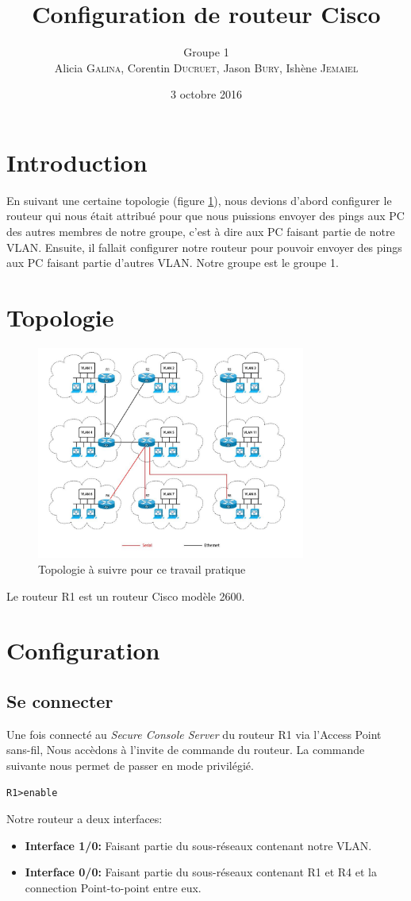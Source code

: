 \documentclass[a4paper,10pt]{article}
\title{Configuration de routeur Cisco}
\author{Groupe 1\\Alicia \textsc{Galina}, Corentin \textsc{Ducruet}, Jason \textsc{Bury}, Ishène \textsc{Jemaiel}}
\date{3 octobre 2016}
\begin{document}
\maketitle

\section{Introduction}
En suivant une certaine topologie (figure \ref{fig:topo}),
nous devions d'abord configurer le routeur qui nous était attribué pour que nous puissions envoyer des pings aux PC des autres membres de notre groupe,
c'est à dire aux PC faisant partie de notre VLAN.
Ensuite, il fallait configurer notre routeur pour pouvoir envoyer des pings aux PC faisant partie d'autres VLAN.
Notre groupe est le groupe 1.

\section{Topologie}
\begin{figure}
 \centering
 \includegraphics[height=7cm]{topo.jpg}
 \caption{Topologie à suivre pour ce travail pratique}
 \label{fig:topo}
\end{figure}
Le routeur R1 est un routeur Cisco modèle 2600.

\section{Configuration}
\subsection{Se connecter}
Une fois connecté au \textit{Secure Console Server} du routeur R1 via l'Access Point sans-fil, Nous accèdons à l'invite de commande du routeur.
La commande suivante nous permet de passer en mode privilégié.
\begin{verbatim}
R1>enable
\end{verbatim}
Notre routeur a deux interfaces:
\begin{itemize}
 \item \textbf{Interface 1/0:} Faisant partie du sous-réseaux contenant notre VLAN.
 \item \textbf{Interface 0/0:} Faisant partie du sous-réseaux contenant R1 et R4 et la connection Point-to-point entre eux.
\end{itemize}
\end{document}
